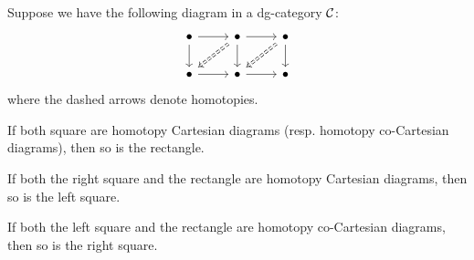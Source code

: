 \begin{proposition}\label{prop:Pasting}
Suppose we have the following diagram in a dg-category ${\cal C}$:
\[
\begin{tikzcd}
\bullet\ar{r}\ar{d} & 
\bullet\ar{r}\ar{d}\ar[dl,Rightarrow,dashed] & 
\bullet\ar{d}\ar[dl,Rightarrow,dashed] \\
\bullet\ar{r} & 
\bullet\ar{r} & 
\bullet
\end{tikzcd}
\]
where the dashed arrows denote homotopies. 
\begin{proplist}
\item 
If both square are homotopy Cartesian diagrams 
(resp. homotopy co-Cartesian diagrams), 
then so is the rectangle.
\item 
If both the right square and the rectangle 
are homotopy Cartesian diagrams, 
then so is the left square.
\item 
If both the left square and the rectangle 
are homotopy co-Cartesian diagrams, 
then so is the right square.
\end{proplist}
\end{proposition}
